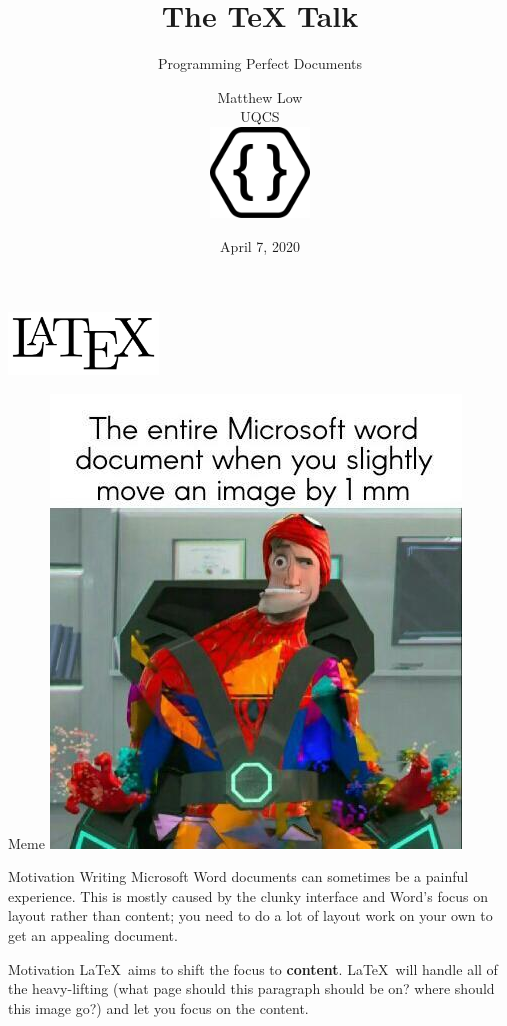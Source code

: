 \documentclass[aspectratio=43, 10pt]{beamer}
\title{The \textbf{\TeX} Talk}
\subtitle{Programming Perfect Documents}
\author{Matthew Low\\\color{uqcs}UQCS\\\vspace{1.5em}\includegraphics[width=0.2\textwidth]{figures/uqcs}}
\date{April 7, 2020}
\begin{document}
\begin{frame}
\centering
\vspace{2em}
\includegraphics[width=0.3\textwidth]{figures/latexlogo}
\maketitle	
\end{frame}

\begin{frame}{Meme}
\centering
\includegraphics[height=0.7\textheight]{figures/meme}
\end{frame}

\begin{frame}{Motivation}
	Writing Microsoft Word documents can sometimes be a painful experience. This is mostly caused by the clunky interface and Word's focus on layout rather than content; you need to do a lot of layout work on your own to get an appealing document.
\end{frame}

\begin{frame}{Motivation}
	\LaTeX \ aims to shift the focus to \textbf{content}. \LaTeX \ will handle all of the heavy-lifting (what page should this paragraph should be on? where should this image go?) and let you focus on the content.
\end{frame}
\end{document}
